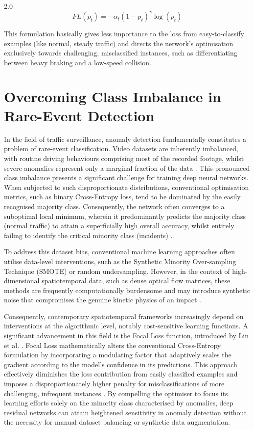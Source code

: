 \begin{spacing}{2.0}
\begin{equation}
FL(p_t) = -\alpha_t(1-p_t)^\gamma \log(p_t)
\label{eq:focal_loss}
\end{equation}

This formulation basically gives less importance to the loss from easy-to-classify examples (like normal, steady traffic) and directs the network’s optimisation exclusively towards challenging, misclassified instances, such as differentiating between heavy braking and a low-speed collision.

\section{Overcoming Class Imbalance in Rare-Event Detection}
In the field of traffic surveillance, anomaly detection fundamentally constitutes a problem of rare-event classification. Video datasets are inherently imbalanced, with routine driving behaviours comprising most of the recorded footage, whilst severe anomalies represent only a marginal fraction of the data \cite{sultani_real-world_2018}. This pronounced class imbalance presents a significant challenge for training deep neural networks. When subjected to such disproportionate distributions, conventional optimisation metrics, such as binary Cross-Entropy loss, tend to be dominated by the easily recognised majority class. Consequently, the network often converges to a suboptimal local minimum, wherein it predominantly predicts the majority class (normal traffic) to attain a superficially high overall accuracy, whilst entirely failing to identify the critical minority class (incidents) \cite{buda_systematic_2018}.

To address this dataset bias, conventional machine learning approaches often utilise data-level interventions, such as the Synthetic Minority Over-sampling Technique (SMOTE) or random undersampling. However, in the context of high-dimensional spatiotemporal data, such as dense optical flow matrices, these methods are frequently computationally burdensome and may introduce synthetic noise that compromises the genuine kinetic physics of an impact \cite{haibo_he_learning_2009}.

Consequently, contemporary spatiotemporal frameworks increasingly depend on interventions at the algorithmic level, notably cost-sensitive learning functions. A significant advancement in this field is the Focal Loss function, introduced by Lin et al. \cite{lin_focal_2017}. Focal Loss mathematically alters the conventional Cross-Entropy formulation by incorporating a modulating factor that adaptively scales the gradient according to the model’s confidence in its predictions. This approach effectively diminishes the loss contribution from easily classified examples and imposes a disproportionately higher penalty for misclassifications of more challenging, infrequent instances \cite{lin_focal_2017}. By compelling the optimiser to focus its learning efforts solely on the minority class characterised by anomalies, deep residual networks can attain heightened sensitivity in anomaly detection without the necessity for manual dataset balancing or synthetic data augmentation.


\end{spacing}
